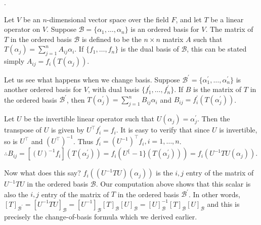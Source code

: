 \documentclass[8pt]{beamer}
\newcommand{\mc}[1]{\mathcal{#1}}
\begin{document}
\begin{frame}{.}
    \begin{example}    
        Let $V$ be an $n$-dimensional vector space over the field $F$, and let $T$ be a linear operator on $V$.
        Suppose $\mc{B} = \{\alpha_1, \dots, \alpha_n\}$ is an ordered basis for $V$.
        The matrix of $T$ in the ordered basis $\mc{B}$ is defined to be the $n \times n$ matrix $A$ such that $T(\alpha_j) = \sum_{j=1}^n A_{ij} \alpha_i$.
        If $\{f_1, \dots, f_n\}$ is the dual basis of $\mc{B}$, this can be stated simply $A_{ij}=f_i (T(\alpha_j))$.

        \smallskip
        Let us see what happens when we change basis.
        Suppose $\mc{B}^\prime = \{\alpha^\prime_1, \dots, \alpha^\prime_n\}$ is another ordered basis for $V$, with dual basis $\{f_1^\prime, \dots, f^\prime_n\}$.
        If $B$ is the matrix of $T$ in the ordered basis $\mc{B}^\prime$, then $T(\alpha_j^\prime) = \sum_{j=1}^n B_{ij} \alpha_i$ and $B_{ij} = f^\prime_i (T(\alpha_j^\prime))$.

        \smallskip
        Let $U$ be the invertible linear operator such that $U(\alpha_j)= \alpha_j^\prime$.
        Then the transpose of $U$ is given by $U^\top f^\prime_i = f_i$.
        It is easy to verify that since $U$ is invertible, so is $U^\top$ and $(U^\top)^{-1}$.
        Thus $f^\prime_i = (U^{-1})^\top f_i, i=1, \dots, n$.
        $\therefore B_{ij} = [(U)^{-1}f_i](T(\alpha_j^\prime)) = f_i(U^\{-1\}(T(\alpha^\prime_j))) = f_i(U^{-1} T U(\alpha_j))$.

        \smallskip
        Now what does this say? $f_i((U^{-1}T U)(\alpha_j))$ is the $i,j$ entry of the matrix of $U^{-1}TU$ in the ordered basis $\mc{B}$.
        Our computation above shows that this scalar is also the $i,j$ entry of the matrix of $T$ in the ordered basis $\mc{B}^\prime$.
        In other words, $[T]_{\mc{B}^\prime} = [U^{-1} T U]_{\mc{B}} = [U^{-1}]_{\mc{B}} [T]_{\mc{B}} [U]_{\mc{B}} = [U]_{\mc{B}}^{-1} [T]_{\mc{B}} [U]_{\mc{B}}$ and this is precisely the change-of-basis formula which we derived earlier.
    \end{example}
\end{frame}
\end{document}

